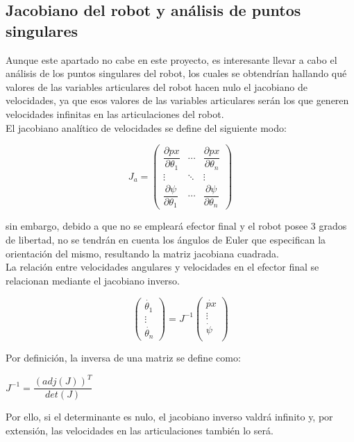 \subsection{Jacobiano del robot y análisis de puntos singulares}

Aunque este apartado no cabe en este proyecto, es interesante llevar a cabo el análisis de los puntos singulares del robot, los cuales se obtendrían hallando qué valores de las variables articulares del robot hacen nulo el jacobiano de velocidades, ya que esos valores de las variables articulares serán los que generen velocidades infinitas en las articulaciones del robot.\\

El jacobiano analítico de velocidades se define del siguiente modo:



\begin{equation}
J_{a} =
\begin{pmatrix}

\dfrac{\partial px}{\partial \theta_{1}} & \cdots & \dfrac{\partial px}{\partial \theta_{n}} \\

\vdots  & \ddots & \vdots  \\

\dfrac{\partial \psi}{\partial \theta_{1}} & \cdots & \dfrac{\partial \psi}{\partial \theta_{n}}
\end{pmatrix}
\end{equation}



sin embargo, debido a que no se empleará efector final y el robot posee 3 grados de libertad, no se tendrán en cuenta los ángulos de Euler que especifican la orientación del mismo, resultando la matriz jacobiana cuadrada.\\



La relación entre velocidades angulares y velocidades en el efector final se relacionan mediante el jacobiano inverso.

\begin{equation}
\begin{pmatrix}

\dot{\theta_{1}} \\

\vdots  \\

\dot{\theta_{n}}
\end{pmatrix}
= J^{-1}
\begin{pmatrix}

\dot{px} \\

\vdots  \\

\dot{\psi} \\
\end{pmatrix}
\end{equation}

Por definición, la inversa de una matriz se define como:\\

\begin{center}
	
	$ J^{-1}=\dfrac{(adj(J))^{T}}{det(J)}$
	
\end{center}

Por ello, si el determinante es nulo, el jacobiano inverso valdrá infinito y, por extensión, las velocidades en las articulaciones también lo será.\\